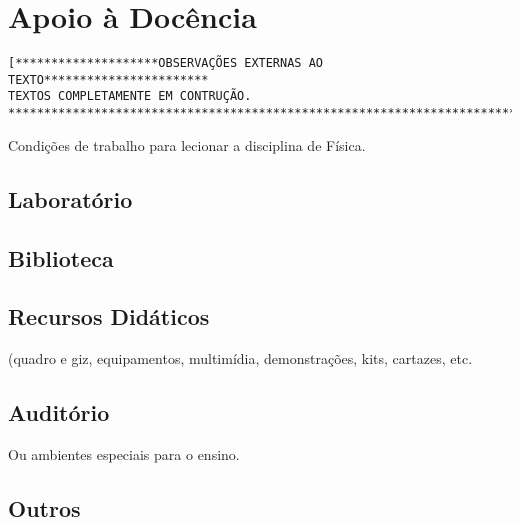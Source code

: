 \chapter{Apoio à Docência}
\begin{verbatim}
[********************OBSERVAÇÕES EXTERNAS AO TEXTO***********************
TEXTOS COMPLETAMENTE EM CONTRUÇÃO.
*************************************************************************]
\end{verbatim}
Condições de trabalho para lecionar a disciplina de Física.

\section{Laboratório}
\section{Biblioteca}
\section{Recursos Didáticos}
(quadro e giz, equipamentos, multimídia, demonstrações, kits,
cartazes, etc.
\section{Auditório}
Ou ambientes especiais para o ensino.
\section{Outros}